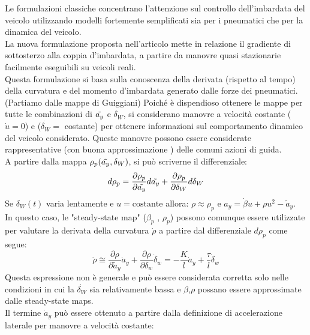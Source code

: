Le formulazioni classiche concentrano l'attenzione sul controllo dell'imbardata del veicolo utilizzando modelli fortemente semplificati sia per i pneumatici che per la dinamica del veicolo.\\
La nuova formulazione proposta nell'articolo \cite{doi:10.1080/00423114.2016.1167225} mette in relazione  il gradiente di sottosterzo alla coppia d'imbardata, a partire da manovre quasi stazionarie facilmente eseguibili su veicoli reali.\\
Questa formulazione si basa sulla conoscenza della derivata (rispetto al tempo) della curvatura e del momento d'imbardata generato dalle forze dei pneumatici.\\

(Partiamo dalle mappe di Guiggiani)
Poiché è dispendioso ottenere le mappe per tutte le combinazioni di $\Tilde{a_y}$ e $\delta_W$, si considerano manovre a velocità costante ($\dot{u} = 0$) e ($\dot{\delta_W} =$ costante) per ottenere informazioni sul comportamento dinamico del veicolo considerato. Queste manovre possono essere considerate rappresentative (con buona approssimazione ) delle comuni azioni di guida.\\
A partire dalla mappa $\rho_p(\Tilde{a_y}, \delta_W)$, si può scriverne il differenziale:
\begin{equation}
   d\rho_p = \frac{\partial \rho_p}{\partial \Tilde{a_y}} d\Tilde{a_y} + \frac{\partial \rho_p}{\partial \delta_W} d\delta_W 
\end{equation}
Se $\delta_W(t)$ varia lentamente e $u = \text{costante}$ allora: \quad $\rho \approx \rho_p$ \quad e \quad  $a_y = \dot{\beta}u + \rho u^2 - \tilde{a}_y$.\\ 
In questo caso, le "steady-state map" ($\beta_p$ , $\rho_p$) possono comunque essere utilizzate per valutare la derivata della curvatura $\dot{\rho}$ a partire dal differenziale $d\rho_p$ come segue:
\begin{equation} \label{17}
\dot{\rho} \cong \frac{\partial \rho}{\partial \tilde{a}_y} \dot{a}_y + \frac{\partial \rho}{\partial \delta_w} \dot{\delta}_w = - \frac{K}{l}\dot{a}_y + \frac{\tau}{l} \dot{\delta}_w
\end{equation}
Questa espressione non è generale e può essere considerata corretta solo nelle condizioni in cui la $\dot{\delta_W}$ sia relativamente bassa e $\beta$,$\rho$ possano essere approssimate dalle steady-state maps.\\
Il termine $\dot{a}_y$ può essere ottenuto a partire dalla definizione di accelerazione laterale per manovre a velocità costante:
